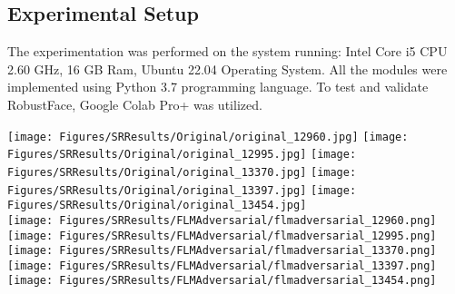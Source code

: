 \documentclass[sn-mathphys]{sn-jnl}%
\theoremstyle{thmstyleone}%
\theoremstyle{thmstyletwo}%
\theoremstyle{thmstylethree}%
\begin{document}
\subsection{Experimental Setup}
The experimentation was performed on the system running: Intel Core i5 CPU 2.60 GHz, 16 GB Ram, Ubuntu 22.04 Operating System. All the modules were implemented using Python 3.7 programming language. To test and validate RobustFace, Google Colab Pro+ was utilized.
 \begin{figure*}
\centering     %
\texttt{[image: Figures/SRResults/Original/original\_12960.jpg]}
\texttt{[image: Figures/SRResults/Original/original\_12995.jpg]}
\texttt{[image: Figures/SRResults/Original/original\_13370.jpg]}
\texttt{[image: Figures/SRResults/Original/original\_13397.jpg]}
\texttt{[image: Figures/SRResults/Original/original\_13454.jpg]}\\
\texttt{[image: Figures/SRResults/FLMAdversarial/flmadversarial\_12960.png]}
\texttt{[image: Figures/SRResults/FLMAdversarial/flmadversarial\_12995.png]}
\texttt{[image: Figures/SRResults/FLMAdversarial/flmadversarial\_13370.png]}
\texttt{[image: Figures/SRResults/FLMAdversarial/flmadversarial\_13397.png]}
\texttt{[image: Figures/SRResults/FLMAdversarial/flmadversarial\_13454.png]}\\

\end{figure*}
\end{document}
